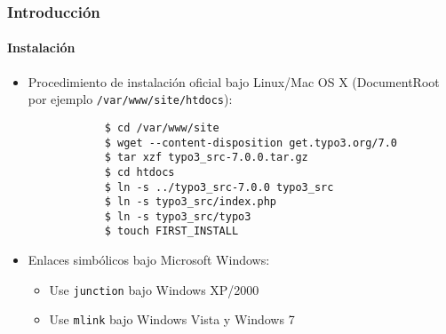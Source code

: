 \begin{frame}[fragile]
	\frametitle{Introducción}
	\framesubtitle{Instalación}

	\begin{itemize}
		\item Procedimiento de instalación oficial bajo Linux/Mac OS X\newline
			(DocumentRoot por ejemplo \texttt{/var/www/site/htdocs}):
		\begin{lstlisting}
			$ cd /var/www/site
			$ wget --content-disposition get.typo3.org/7.0
			$ tar xzf typo3_src-7.0.0.tar.gz
			$ cd htdocs
			$ ln -s ../typo3_src-7.0.0 typo3_src
			$ ln -s typo3_src/index.php
			$ ln -s typo3_src/typo3
			$ touch FIRST_INSTALL
		\end{lstlisting}

		\item Enlaces simbólicos bajo Microsoft Windows:

			\begin{itemize}
				\item Use \texttt{junction} bajo Windows XP/2000
				\item Use \texttt{mlink} bajo Windows Vista y Windows 7
			\end{itemize}

	\end{itemize}
\end{frame}


